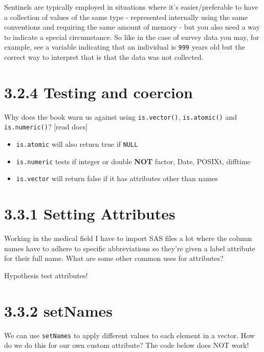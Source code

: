 \documentclass[]{book}
\providecommand{\tightlist}{%
  \setlength{\itemsep}{0pt}\setlength{\parskip}{0pt}}
\begin{document}
Sentinels are typically employed in situations where it's easier/preferable to have a collection of values of the same type - represented internally using the same conventions and requiring the same amount of memory - but you also need a way to indicate a special circumstance. So like in the case of survey data you may, for example, see a variable indicating that an individual is \texttt{999} years old but the correct way to interpret that is that the data was not collected.

\hypertarget{testing-and-coercion}{%
\section*{3.2.4 Testing and coercion}\label{testing-and-coercion}}

Why does the book warn us against using \texttt{is.vector()}, \texttt{is.atomic()} and \texttt{is.numeric()}? {[}read docs{]}

\begin{itemize}
\tightlist
\item
  \texttt{is.atomic} will also return true if \texttt{NULL}
\item
  \texttt{is.numeric} tests if integer or double \textbf{NOT} factor, Date, POSIXt, difftime
\item
  \texttt{is.vector} will return false if it has attributes other than names
\end{itemize}

\hypertarget{setting-attributes}{%
\section*{3.3.1 Setting Attributes}\label{setting-attributes}}

Working in the medical field I have to import SAS files a lot where the column names have to adhere to specific abbreviations so they're given a label attribute for their full name. What are some other common uses for attributes?

Hypothesis test attributes!

\hypertarget{setnames}{%
\section*{3.3.2 setNames}\label{setnames}}

We can use \texttt{setNames} to apply different values to each element in a vector. How do we do this for our own custom attribute? The code below does NOT work!
\end{document}

